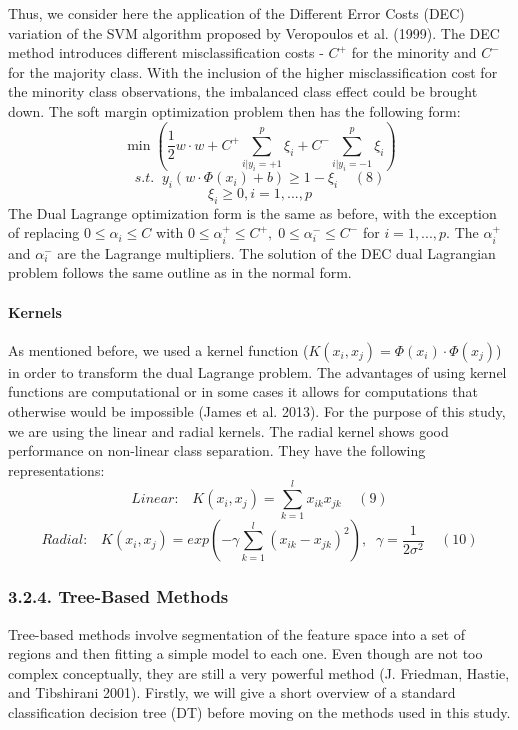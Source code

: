\documentclass[12pt,]{article}
\let\oldparagraph\paragraph
\renewcommand{\paragraph}[1]{\oldparagraph{#1}\mbox{}}
\begin{document}
Thus, we consider here the application of the Different Error Costs
(DEC) variation of the SVM algorithm proposed by Veropoulos et al.
(1999). The DEC method introduces different misclassification costs -
\(C^+\) for the minority and \(C^-\) for the majority class. With the
inclusion of the higher misclassification cost for the minority class
observations, the imbalanced class effect could be brought down. The
soft margin optimization problem then has the following form:
\[\min{(\frac{1}{2}w \cdot w + C^+\sum_{i|y_i=+1}^{p}\xi_i + C^-\sum_{i|y_i=-1}^{p}\xi_i)}\]
\[s.t. \;\; y_i(w \cdot \Phi(x_i) + b) \geq 1 - \xi_i\;\;\;\;(8)\]
\[\xi_i \geq 0, i = 1,...,p\] The Dual Lagrange optimization form is the
same as before, with the exception of replacing \(0 \leq\alpha_i\leq C\)
with \(0 \leq\alpha_i^+\leq C^+, \; 0 \leq\alpha_i^-\leq C^-\) for
\(i=1,...,p\). The \(\alpha_i^+\) and \(\alpha_i^-\) are the Lagrange
multipliers. The solution of the DEC dual Lagrangian problem follows the
same outline as in the normal form.

\hypertarget{kernels}{%
\paragraph{Kernels}\label{kernels}}

As mentioned before, we used a kernel function
(\(K(x_i,x_j) = \Phi(x_i)\cdot \Phi(x_j)\)) in order to transform the
dual Lagrange problem. The advantages of using kernel functions are
computational or in some cases it allows for computations that otherwise
would be impossible (James et al. 2013). For the purpose of this study,
we are using the linear and radial kernels. The radial kernel shows good
performance on non-linear class separation. They have the following
representations:
\[Linear: \;\;\; K(x_i,x_j) = \sum_{k=1}^{l}x_{ik}x_{jk}\;\;\;\;(9)\]
\[Radial: \;\;\; K(x_i,x_j) = exp(-\gamma\sum_{k=1}^{l}(x_{ik}-x_{jk})^2), \;\; \gamma=\frac{1}{2\sigma^2}\;\;\;\;(10)\]

\hypertarget{tree-based-methods}{%
\subsubsection{3.2.4. Tree-Based Methods}\label{tree-based-methods}}

Tree-based methods involve segmentation of the feature space into a set
of regions and then fitting a simple model to each one. Even though are
not too complex conceptually, they are still a very powerful method (J.
Friedman, Hastie, and Tibshirani 2001). Firstly, we will give a short
overview of a standard classification decision tree (DT) before moving
on the methods used in this study.
\end{document}
